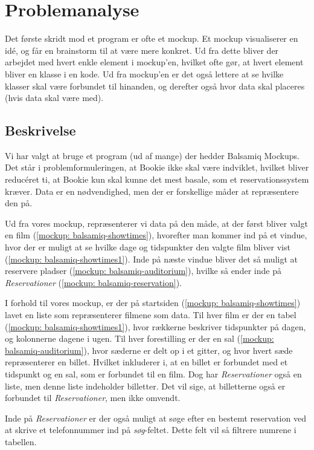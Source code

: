 \chapter{Problemanalyse}

Det første skridt mod et program er ofte et mockup. Et mockup visualiserer en idé, og får en brainstorm til at være mere konkret. Ud fra dette bliver der arbejdet med hvert enkle element i mockup'en, hvilket ofte gør, at hvert element bliver en klasse i en kode. Ud fra mockup'en er det også lettere at se hvilke klasser skal være forbundet til hinanden, og derefter også hvor data skal placeres (hvis data skal være med).

\section{Beskrivelse}

Vi har valgt at bruge et program (ud af mange) der hedder Balsamiq Mockups.
Det står i problemformuleringen, at Bookie ikke skal være indviklet, hvilket bliver reducéret ti, at Bookie kun skal kunne det mest basale, som et reservationssystem kræver. Data er en nødvendighed, men der er forskellige måder at repræsentere den på.

Ud fra vores mockup, repræsenterer vi data på den måde, at der først bliver valgt en film (\ref{mockup: balsamiq-showtimes}), hvorefter man kommer ind på et vindue, hvor der er muligt at se hvilke dage og tidspunkter den valgte film bliver vist (\ref{mockup: balsamiq-showtimes1}). Inde på næste vindue bliver det så muligt at reservere pladser (\ref{mockup: balsamiq-auditorium}), hvilke så ender inde på \textit{Reservationer} (\ref{mockup: balsamiq-reservation}).

I forhold til vores mockup, er der på startsiden (\ref{mockup: balsamiq-showtimes}) lavet en liste som repræsenterer filmene som data. Til hver film er der en tabel (\ref{mockup: balsamiq-showtimes1}), hvor rækkerne beskriver tidspunkter på dagen, og kolonnerne dagene i ugen. Til hver forestilling er der en sal (\ref{mockup: balsamiq-auditorium}), hvor sæderne er delt op i et gitter, og hvor hvert sæde repræsenterer en billet. Hvilket inkluderer i, at en billet er forbundet med et tidspunkt og en sal, som er forbundet til en film. Dog har \textit{Reservationer} også en liste, men denne liste indeholder billetter. Det vil sige, at billetterne også er forbundet til \textit{Reservationer}, men ikke omvendt.

Inde på \textit{Reservationer} er der også muligt at søge efter en bestemt reservation ved at skrive et telefonnummer ind på \textit{søg}-feltet. Dette felt vil så filtrere numrene i tabellen.

